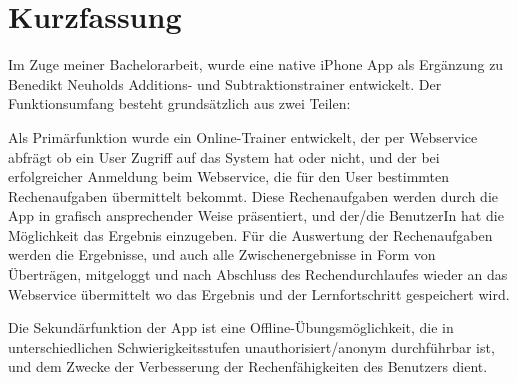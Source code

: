 

\chapter*{Kurzfassung}
\label{cha:abstract}



Im Zuge meiner Bachelorarbeit, wurde eine native iPhone App als Ergänzung
zu Benedikt Neuholds Additions- und Subtraktionstrainer entwickelt. 
Der Funktionsumfang besteht grundsätzlich aus zwei Teilen: 

Als Primärfunktion wurde ein Online-Trainer entwickelt, der per Webservice abfrägt 
ob ein User Zugriff auf das System hat oder nicht, und der bei erfolgreicher Anmeldung beim 
Webservice, die für den User bestimmten Rechenaufgaben übermittelt bekommt.
Diese Rechenaufgaben werden durch die App in grafisch ansprechender Weise präsentiert,
und der/die BenutzerIn hat die Möglichkeit das Ergebnis einzugeben.
Für die Auswertung der Rechenaufgaben werden die Ergebnisse, und auch alle Zwischenergebnisse 
in Form von Überträgen, mitgeloggt und nach Abschluss des Rechendurchlaufes wieder 
an das Webservice übermittelt wo das Ergebnis und der Lernfortschritt gespeichert wird.

Die Sekundärfunktion der App ist eine Offline-Übungsmöglichkeit, die in unterschiedlichen 
Schwierigkeitsstufen unauthorisiert/anonym durchführbar ist, und dem Zwecke der Verbesserung
der Rechenfähigkeiten des Benutzers dient. 



